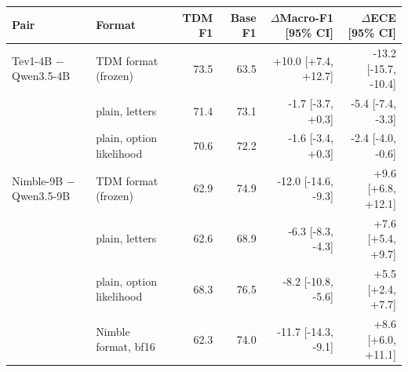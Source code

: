 \begin{tabular}{llrrrr}
\toprule
Pair & Format & TDM F1 & Base F1 & $\Delta$Macro-F1 [95\% CI] & $\Delta$ECE [95\% CI] \\
\midrule
\rowcolor{rowhl} Tev1-4B $-$ Qwen3.5-4B & TDM format (frozen) & 73.5 & 63.5 & +10.0 [+7.4, +12.7] & -13.2 [-15.7, -10.4] \\
 & plain, letters & 71.4 & 73.1 & -1.7 [-3.7, +0.3] & -5.4 [-7.4, -3.3] \\
 & plain, option likelihood & 70.6 & 72.2 & -1.6 [-3.4, +0.3] & -2.4 [-4.0, -0.6] \\
\midrule
\rowcolor{rowhl} Nimble-9B $-$ Qwen3.5-9B & TDM format (frozen) & 62.9 & 74.9 & -12.0 [-14.6, -9.3] & +9.6 [+6.8, +12.1] \\
 & plain, letters & 62.6 & 68.9 & -6.3 [-8.3, -4.3] & +7.6 [+5.4, +9.7] \\
 & plain, option likelihood & 68.3 & 76.5 & -8.2 [-10.8, -5.6] & +5.5 [+2.4, +7.7] \\
 & Nimble format, bf16 & 62.3 & 74.0 & -11.7 [-14.3, -9.1] & +8.6 [+6.0, +11.1] \\
\bottomrule
\end{tabular}
